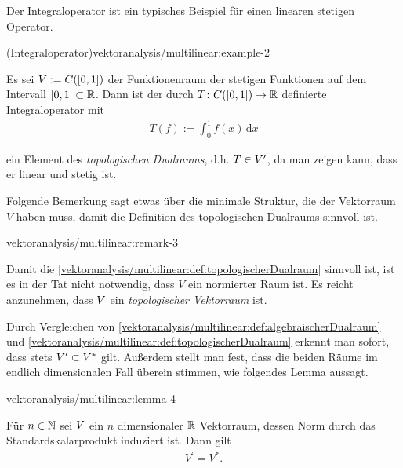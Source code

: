 \par
Der Integraloperator ist ein typisches Beispiel für einen linearen stetigen Operator.
\begin{example}{(Integraloperator)}{vektoranalysis/multilinear:example-2}



\par
Es sei \(V := C([0,1])\) der Funktionenraum der stetigen Funktionen auf dem Intervall \([0,1] \subset \mathbb{R}\).
Dann ist der durch \(T \colon C([0,1]) \rightarrow \mathbb{R}\) definierte Integraloperator mit
\begin{align*}
T(f) := \int_0^1 f(x) \, \mathrm{d}x
\end{align*}
\par
ein Element des \emph{topologischen Dualraums}, d.h. \(T \in V^\prime\), da man zeigen kann, dass er linear und stetig ist.
\end{example}

\par
Folgende Bemerkung sagt etwas über die minimale Struktur, die der Vektorraum \(V\) haben muss, damit die Definition des topologischen Dualraums sinnvoll ist.
\begin{remark}{}{vektoranalysis/multilinear:remark-3}



\par
Damit die \cref{vektoranalysis/multilinear:def:topologischerDualraum} sinnvoll ist, ist es in der Tat nicht notwendig, dass \(V\) ein normierter Raum ist. Es reicht anzunehmen, dass \(V\) ein \emph{topologischer Vektorraum} ist.
\end{remark}

\par
Durch Vergleichen von \cref{vektoranalysis/multilinear:def:algebraischerDualraum} und \cref{vektoranalysis/multilinear:def:topologischerDualraum} erkennt man sofort, dass stets \(V^\prime\subset V^\ast\) gilt.
Außerdem stellt man fest, dass die beiden Räume im endlich dimensionalen Fall überein stimmen, wie folgendes Lemma aussagt.
\begin{lemma}{}{vektoranalysis/multilinear:lemma-4}



\par
Für \(n\in\mathbb{N}\) sei \(V\) ein \(n\) dimensionaler \(\mathbb{R}\) Vektorraum, dessen Norm durch das Standardskalarprodukt induziert ist.
Dann gilt
\begin{align*}
V^\prime = V^\ast.
\end{align*}\end{lemma}

